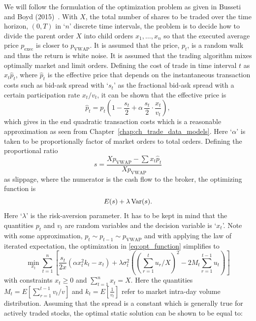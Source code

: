 We will follow the formulation of the optimization problem as given in Busseti and Boyd (2015)~\cite{busseli_boyd}. With $X$, the total number of shares to be traded over the time horizon, $(0,T)$ in `$n$' discrete time intervals, the problem is to decide how to divide the parent order $X$ into child orders $x_1, \ldots, x_n$ so that the executed average price $p_{\text{exec}}$ is closer to $p_{\text{VWAP}}$. It is assumed that the price, $p_t$, is a random walk and thus the return is white noise. It is assumed that the trading algorithm mixes optimally market and limit orders. Defining the cost of trade in time interval $t$ as $x_t \hat{p}_t$, where $\hat{p}_t$ is the effective price that depends on the instantaneous transaction costs such as bid-ask spread with `$s_t$' as the fractional bid-ask spread with a certain participation rate $x_t/v_t$, it can be shown that the effective price is
	\begin{equation}
	\hat{p}_t= p_t \left(1 - \dfrac{s_t}{2} + \alpha \, \dfrac{s_t}{2} \cdot \dfrac{x_t}{v_t} \right),
	\end{equation}
which gives in the end quadratic transaction costs which is a reasonable approximation as seen from Chapter~\ref{chap:ch_trade_data_models}. Here `$\alpha$' is taken to be proportionally factor of market orders to total orders. Defining the proportional ratio
	\begin{equation}
	s= \dfrac{X p_{\text{VWAP}} - \sum x_t \hat{p}_t}{X p_{\text{VWAP}}}
	\end{equation}
as slippage, where the numerator is the cash flow to the broker, the optimizing function is
	\begin{equation} \label{eq:opt_function}
	E(s) + \lambda \var(s).
	\end{equation}
Here `$\lambda$' is the risk-aversion parameter. It has to be kept in mind that the quantities $p_t$ and $v_t$ are random variables and the decision variable is `$x_t$'. Note with some approximation, $p_t \sim p_{t-1} \sim p_{\text{VWAP}}$ and with applying the law of iterated expectation, the optimization in \eqref{eq:opt_function} simplifies to
	\begin{equation}
	\min_{x_t} \sum_{t=1}^n \left[ \dfrac{s_t}{2x} (\alpha x_t^2 k_t - x_t) + \lambda \sigma_t^2 \left( \left( \sum_{r=1}^t u_r/X \right)^2 - 2 M_t \sum_{r=1}^{t-1} u_t \right) \right]
	\end{equation}
with constraints $x_t \geq 0$ and $\sum_{t=1}^n x_t = X$. Here the quantities $M_t= E \left[ \sum_{r=1}^{t-1} v_t/v\right]$ and $k_t= E[\frac{1}{v_t}]$ refer to market intra-day volume distribution. Assuming that the spread is a constant which is generally true for actively traded stocks, the optimal static solution can be shown to be equal to:
